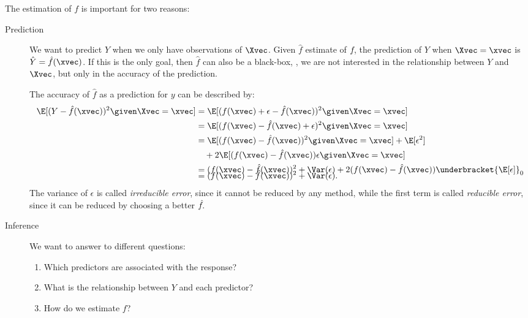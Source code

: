 The estimation of $f$ is important for two reasons:
\begin{description}
    \item[Prediction] We want to predict $Y$ when we only have observations of $\Xvec$. Given $\hat{f}$ estimate of $f\negthinspace$, the prediction of $Y$ when $\Xvec = \xvec$ is $\hat{Y} = \hat{f}(\xvec)$. If this is the only goal, then $\hat{f}$ can also be a black-box, \ie, we are not interested in the relationship between $Y$ and $\Xvec$, but only in the accuracy of the prediction.

          The accuracy of $\hat{f}$ as a prediction for $y$ can be described by:
          \begin{equation}
              \begin{aligned}
                  \E[(Y - \hat{f}(\xvec))^2 \given \Xvec = \xvec] & = \E[(f(\xvec) + \epsilon - \hat{f}(\xvec))^2 \given \Xvec = \xvec]                                            \\
                                                                  & = \E[(f(\xvec)- \hat{f}(\xvec) + \epsilon)^2 \given \Xvec = \xvec]                                             \\
                                                                  & = \E[(f(\xvec) - \hat{f}(\xvec))^2 \given \Xvec = \xvec] + \E[\epsilon^2]                                      \\
                                                                  & \quad+ 2\E[(f(\xvec) - \hat{f}(\xvec))\epsilon \given \Xvec = \xvec]                                           \\
                                                                  & = (f(\xvec) - \hat{f}(\xvec))^2 + \Var(\epsilon) + 2(f(\xvec) - \hat{f}(\xvec))\underbracket{\E[\epsilon]}_{0} \\[-1em]
                                                                  & = (f(\xvec) - \hat{f}(\xvec))^2 + \Var(\epsilon).
              \end{aligned}
          \end{equation}
          The variance of $\epsilon$ is called \emph{irreducible error}, since it cannot be reduced by any method, while the first term is called \emph{reducible error}, since it can be reduced by choosing a better $\hat{f}\negthinspace$.
    \item[Inference] We want to answer to different questions:
          \begin{enumerate}
              \item Which predictors are associated with the response?
              \item What is the relationship between $Y$ and each predictor?
              \item How do we estimate $f$?
          \end{enumerate}


\end{description}
